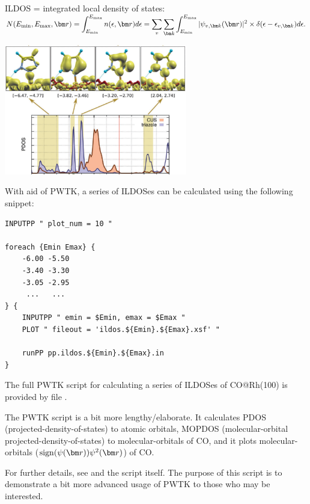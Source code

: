 \documentclass[landscape]{foils}
\begin{document}

ILDOS = integrated local density of states:\\[0.5em]
{\black
$\displaystyle
N(E_{\rm min},E_{\rm max},\vr) = 
 \int_{E_{\rm min}}^{E_{\rm max}}  n(\epsilon,\vr) d\epsilon 
 = \sum_v\sum_{\vk}
  \int_{E_{\rm min}}^{E_{\rm max}} |\psi_{v,\vk}(\vr)|^2 \times
  \delta(\epsilon-\epsilon_{v,\vk}) d\epsilon.$
}

\begin{center}
  \includegraphics[width=0.6\textwidth]{figs/ildos.png}
\end{center}

With aid of PWTK, a series of ILDOSes can be calculated using the following snippet:
{
  \codecolor\small
\begin{verbatim}
INPUTPP " plot_num = 10 "

foreach {Emin Emax} {
    -6.00 -5.50
    -3.40 -3.30
    -3.05 -2.95
     ...   ...
} {
    INPUTPP " emin = $Emin, emax = $Emax "
    PLOT " fileout = 'ildos.${Emin}.${Emax}.xsf' "

    runPP pp.ildos.${Emin}.${Emax}.in
}
\end{verbatim}
}

The full PWTK script for calculating a series of ILDOSes of
CO@Rh(100) is provided by file .


The PWTK script  is a bit more lengthy/elaborate. It
calculates PDOS (projected-density-of-states) to atomic orbitals,
MOPDOS (molecular-orbital projected-density-of-states) to
molecular-orbitals of CO, and it plots molecular-orbitals
($\sign(\psi(\vr))\psi^2(\vr)$) of CO.

For further details, see  and the 
script itself. The purpose of this script is to demonstrate a bit more
advanced usage of PWTK to those who may be interested.
\end{document}
